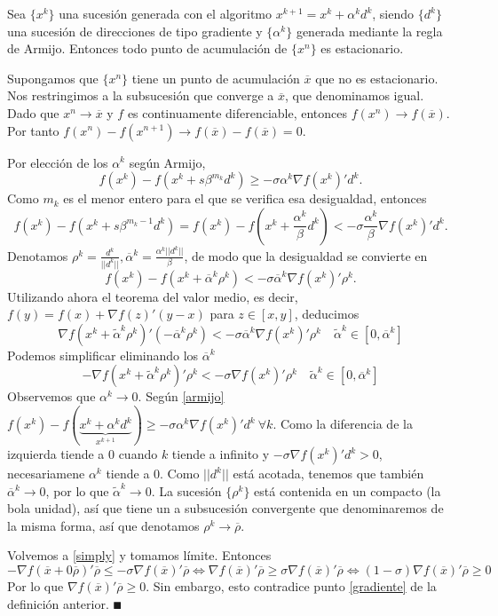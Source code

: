 \documentclass[MIOP.tex]{subfiles}
\begin{document}
\begin{teorema}
Sea $\{x^k\}$ una sucesión generada con el algoritmo $x^{k+1}=x^k+\alpha^kd^k$, siendo $\{d^k\}$ una sucesión de direcciones de tipo gradiente y $\{\alpha^k\}$ generada mediante la regla de Armijo. Entonces todo punto de acumulación de $\{x^n\}$ es estacionario.
\end{teorema}
\begin{dem}
Supongamos que $\{x^n\}$ tiene un punto de acumulación $\overline{x}$ que no es estacionario. Nos restringimos a la subsucesión que converge a $\overline{x}$, que denominamos igual. Dado que $x^n\to \overline{x}$ y $f$ es continuamente diferenciable, entonces $f(x^n)\to f(\overline{x})$. Por tanto $f(x^n)-f(x^{n+1})\to f(\overline{x})-f(\overline{x})=0$. 

Por elección de los $\alpha^k$ según Armijo, 
\begin{equation}\label{armijo}
f(x^k)-f(x^k+s\beta^{m_k}d^k)\geq -\sigma\alpha^k\nabla f(x^k)'d^k.
\end{equation}
 Como $m_k$ es el menor entero para el que se verifica esa desigualdad, entonces 
$$f(x^k)-f(x^k+{s\beta^{m_k-1}}d^k)=f(x^k)-f(x^k+\frac{\alpha^k}{\beta}d^k)<-\sigma\frac{\alpha^k}{\beta}\nabla f(x^k)'d^k.$$ 
Denotamos $\rho^k=\frac{d^k}{||d^k||},\overline{\alpha}^k=\frac{\alpha^k||d^k||}{\beta}$, de modo que la desigualdad se convierte en 
$$ f(x^k)-f(x^k+\overline{\alpha}^k\rho^k)< -\sigma\overline{\alpha}^k\nabla f(x^k)'\rho^k.$$
Utilizando ahora el teorema del valor medio, es decir, $f(y)=f(x)+\nabla f(z)'(y-x)$ para $z\in[x,y]$, deducimos
$$\nabla f(x^k+\tilde{\alpha}^k\rho^k)'(-\overline{\alpha}^k\rho^k) <-\sigma\overline{\alpha}^k\nabla f(x^k)'\rho^k\quad \tilde{\alpha}^k\in[0,\overline{\alpha}^k]$$
Podemos simplificar eliminando los $\overline{\alpha}^k$
\begin{equation}\label{simply}
-\nabla f(x^k+\tilde{\alpha}^k\rho^k)'\rho^k <-\sigma\nabla f(x^k)'\rho^k\quad \tilde{\alpha}^k\in[0,\overline{\alpha}^k]
\end{equation}
Observemos que $\alpha^k\to 0$. Según \ref{armijo}
$f(x^k)-f(\underbrace{x^k+\alpha^kd^k}_{x^{k+1}})\geq -\sigma\alpha^k\nabla f(x^k)'d^k\ \forall k$. Como la diferencia de la izquierda tiende a 0 cuando $k$ tiende a infinito y $-\sigma\nabla f(x^k)'d^k>0$, necesariamene $\alpha^k$ tiende a 0. Como $||d^k||$ está acotada, tenemos que también $\overline{\alpha}^k\to 0$, por lo que $\tilde{\alpha}^k\to 0$. La sucesión $\{\rho^k\}$ está contenida en un compacto (la bola unidad), así que tiene un a subsucesión convergente que denominaremos de la misma forma, así que denotamos $\rho^k\to\overline{\rho}$. 

Volvemos a \ref{simply} y tomamos límite. Entonces
$$-\nabla f(\overline{x}+0\overline{\rho})'\overline{\rho}\leq-\sigma\nabla f(\overline{x})'\overline{\rho} \Longleftrightarrow \nabla f(\overline{x})'\overline{\rho}\geq\sigma\nabla f(\overline{x})'\overline{\rho} \Longleftrightarrow (1-\sigma)\nabla f(\overline{x})'\overline{\rho}\geq 0$$
Por lo que $\nabla f(\overline{x})'\overline{\rho}\geq 0$. Sin embargo, esto contradice punto \ref{gradiente} de la definición anterior. 
$\QED$
\end{dem}
\end{document}
